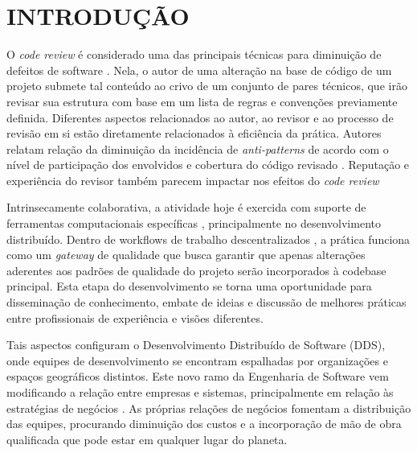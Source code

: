 \documentclass[
        12pt,
        openany, %
        oneside, %
        a4paper,
        english,
        brazil			        %
        ]{abntbibufjf}
\begin{document}
\tableofcontents*
\cleardoublepage



\textual
\pagestyle{simple}


\chapter{INTRODUÇÃO}  %

  O \textit{code review} é considerado uma das principais técnicas para diminuição de defeitos de software \cite{Boehm2001}. Nela, o autor de uma alteração na base de código de um projeto submete tal conteúdo ao crivo de um conjunto de pares técnicos, que irão revisar sua estrutura com base em um lista de regras e convenções previamente definida. Diferentes aspectos relacionados ao autor, ao revisor e ao processo de revisão em si estão diretamente relacionados à eficiência da prática. Autores relatam relação da diminuição da incidência de \textit{anti-patterns} \cite{Kemerer2009} de acordo com o nível de participação dos envolvidos e cobertura do código revisado \cite{Meneely201437, Morales2015171, Bavota201581}. Reputação \cite{Baysal2013122, Bosu2014} e experiência \cite{Kononenko2015111} do revisor também parecem impactar nos efeitos do \textit{code review}

  Intrinsecamente colaborativa, a atividade hoje é exercida com suporte de ferramentas computacionais específicas \cite{Bacchelli2013}, principalmente no desenvolvimento distribuído. Dentro de workflows de trabalho descentralizados \cite{gousios2016}, a prática funciona como um \textit{gateway} de qualidade que busca garantir que apenas alterações aderentes aos padrões de qualidade do projeto serão incorporados à codebase principal. Esta etapa do desenvolvimento se torna uma oportunidade para disseminação de conhecimento, embate de ideias e discussão de melhores práticas entre profissionais de experiência e visões diferentes.

  Tais aspectos configuram o Desenvolvimento Distribuído de Software (DDS), onde equipes de desenvolvimento se encontram espalhadas por organizações e espaços geográficos distintos. Este novo ramo da Engenharia de Software vem modificando a relação entre empresas e sistemas, principalmente em relação às estratégias de negócios \cite{audy2007}. As próprias relações de negócios fomentam a distribuição das equipes, procurando diminuição dos custos e a incorporação de mão de obra qualificada que pode estar em qualquer lugar do planeta.
\end{document}
